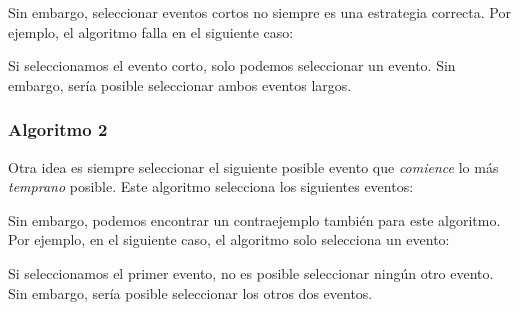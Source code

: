 Sin embargo, seleccionar eventos cortos no siempre
es una estrategia correcta. Por ejemplo, el algoritmo falla
en el siguiente caso:
\begin{center}
\end{center}
Si seleccionamos el evento corto, solo podemos seleccionar un evento.
Sin embargo, sería posible seleccionar ambos eventos largos.

\subsubsection*{Algoritmo 2}

Otra idea es siempre seleccionar el siguiente posible
evento que \emph{comience} lo más \emph{temprano} posible.
Este algoritmo selecciona los siguientes eventos:
\begin{center}
\end{center}

Sin embargo, podemos encontrar un contraejemplo
también para este algoritmo.
Por ejemplo, en el siguiente caso,
el algoritmo solo selecciona un evento:
\begin{center}
\end{center}
Si seleccionamos el primer evento, no es posible
seleccionar ningún otro evento.
Sin embargo, sería posible seleccionar los
otros dos eventos.

